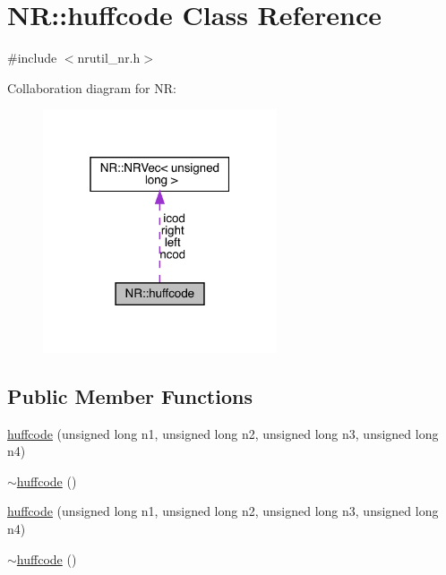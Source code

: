 \hypertarget{classNR_1_1huffcode}{}\section{NR\+:\+:huffcode Class Reference}
\label{classNR_1_1huffcode}


{\ttfamily \#include $<$nrutil\+\_\+nr.\+h$>$}



Collaboration diagram for NR\+:\nopagebreak
\begin{figure}[H]
\begin{center}
\leavevmode
\includegraphics[width=196pt]{de/dd5/classNR_1_1huffcode__coll__graph}
\end{center}
\end{figure}
\subsection*{Public Member Functions}
\begin{DoxyCompactItemize}
\item 
\mbox{\hyperlink{classNR_1_1huffcode_adf21f7c173d14b46a90ca8295cfc61fd}{huffcode}} (unsigned long n1, unsigned long n2, unsigned long n3, unsigned long n4)
\item 
\mbox{\hyperlink{classNR_1_1huffcode_a414a1322987c65cead6e5a0b20727f0f}{$\sim$huffcode}} ()
\item 
\mbox{\hyperlink{classNR_1_1huffcode_adf21f7c173d14b46a90ca8295cfc61fd}{huffcode}} (unsigned long n1, unsigned long n2, unsigned long n3, unsigned long n4)
\item 
\mbox{\hyperlink{classNR_1_1huffcode_a414a1322987c65cead6e5a0b20727f0f}{$\sim$huffcode}} ()
\end{DoxyCompactItemize}
